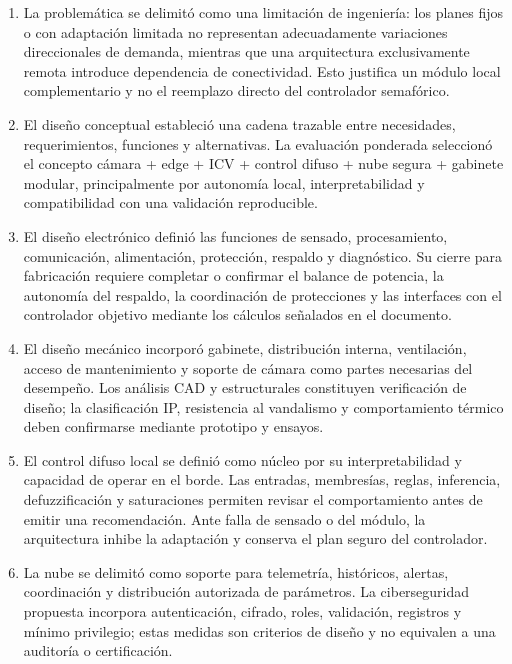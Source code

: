 \documentclass[12pt,a4paper,oneside]{report}
\begin{document}
\begin{enumerate}
\item La problemática se delimitó como una limitación de ingeniería: los planes fijos o con adaptación limitada no representan adecuadamente variaciones direccionales de demanda, mientras que una arquitectura exclusivamente remota introduce dependencia de conectividad. Esto justifica un módulo local complementario y no el reemplazo directo del controlador semafórico.

\item El diseño conceptual estableció una cadena trazable entre necesidades, requerimientos, funciones y alternativas. La evaluación ponderada seleccionó el concepto cámara + edge + ICV + control difuso + nube segura + gabinete modular, principalmente por autonomía local, interpretabilidad y compatibilidad con una validación reproducible.

\item El diseño electrónico definió las funciones de sensado, procesamiento, comunicación, alimentación, protección, respaldo y diagnóstico. Su cierre para fabricación requiere completar o confirmar el balance de potencia, la autonomía del respaldo, la coordinación de protecciones y las interfaces con el controlador objetivo mediante los cálculos señalados en el documento.

\item El diseño mecánico incorporó gabinete, distribución interna, ventilación, acceso de mantenimiento y soporte de cámara como partes necesarias del desempeño. Los análisis CAD y estructurales constituyen verificación de diseño; la clasificación IP, resistencia al vandalismo y comportamiento térmico deben confirmarse mediante prototipo y ensayos.

\item El control difuso local se definió como núcleo por su interpretabilidad y capacidad de operar en el borde. Las entradas, membresías, reglas, inferencia, defuzzificación y saturaciones permiten revisar el comportamiento antes de emitir una recomendación. Ante falla de sensado o del módulo, la arquitectura inhibe la adaptación y conserva el plan seguro del controlador.

\item La nube se delimitó como soporte para telemetría, históricos, alertas, coordinación y distribución autorizada de parámetros. La ciberseguridad propuesta incorpora autenticación, cifrado, roles, validación, registros y mínimo privilegio; estas medidas son criterios de diseño y no equivalen a una auditoría o certificación.


\end{enumerate}
\end{document}
